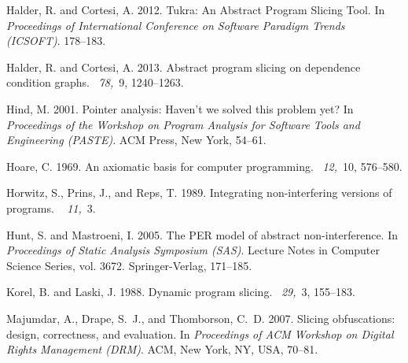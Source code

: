 \documentclass[prodmode,acmtocl]{acmsmall}
\newcommand{\0}{\mbox{\bf 0}}
\begin{document}
\begin{thebibliography}{}
{\sc Halder, R.} {\sc and} {\sc Cortesi, A.} 2012.
\newblock Tukra: {A}n {A}bstract {P}rogram {S}licing {T}ool.
\newblock In {\em Proceedings of International Conference on Software Paradigm
  Trends (ICSOFT)}. 178--183.

{\sc Halder, R.} {\sc and} {\sc Cortesi, A.} 2013.
\newblock Abstract program slicing on dependence condition graphs.
~{\em 78,\/}~9, 1240--1263.

{\sc Hind, M.} 2001.
\newblock Pointer analysis: Haven't we solved this problem yet?
\newblock In {\em Proceedings of the Workshop on Program Analysis for Software
  Tools and Engineering (PASTE)}. ACM Press, New York, 54--61.

{\sc Hoare, C.} 1969.
\newblock An axiomatic basis for computer programming.
~{\em 12,\/}~10, 576--580.

{\sc Horwitz, S.}, {\sc Prins, J.}, {\sc and} {\sc Reps, T.} 1989.
\newblock Integrating non-interfering versions of programs.
~{\em
  11,\/}~3.

{\sc Hunt, S.} {\sc and} {\sc Mastroeni, I.} 2005.
\newblock The {P}{E}{R} model of abstract non-interference.
\newblock In {\em Proceedings of Static Analysis Symposium (SAS)}. Lecture
  Notes in Computer Science Series, vol. 3672. Springer-Verlag, 171--185.

{\sc Korel, B.} {\sc and} {\sc Laski, J.} 1988.
\newblock Dynamic program slicing.
~{\em 29,\/}~3, 155--183.

{\sc Majumdar, A.}, {\sc Drape, S.~J.}, {\sc and} {\sc Thomborson, C.~D.} 2007.
\newblock Slicing obfuscations: design, correctness, and evaluation.
\newblock In {\em Proceedings of ACM Workshop on Digital Rights Management
  (DRM)}. ACM, New York, NY, USA, 70--81.


\end{thebibliography}
\end{document}
